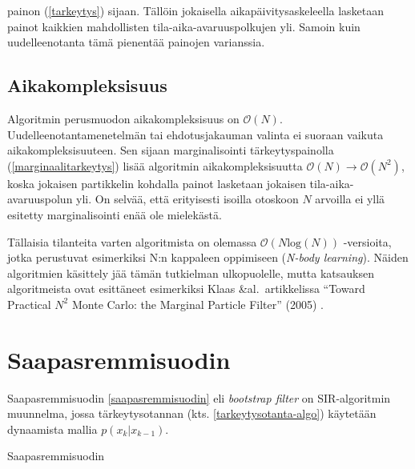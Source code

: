 \documentclass[
  12pt,
  a4paper, twoside]{book}
\begin{document}
\noindent painon (\ref{tarkeytys}) sijaan. Tällöin jokaisella aikapäivitysaskeleella lasketaan painot kaikkien mahdollisten tila-aika-avaruuspolkujen yli. Samoin kuin uudelleenotanta tämä pienentää painojen varianssia.

\subsection{Aikakompleksisuus}

Algoritmin perusmuodon aikakompleksisuus on \(\mathcal{O}(N)\). Uudelleenotantamenetelmän tai ehdotusjakauman valinta ei suoraan vaikuta aikakompleksisuuteen. Sen sijaan marginalisointi tärkeytyspainolla (\ref{marginaalitarkeytys}) lisää algoritmin aikakompleksisuutta \(\mathcal{O}(N)\rightarrow\mathcal{O}(N^2)\), koska jokaisen partikkelin kohdalla painot lasketaan jokaisen tila-aika-avaruuspolun yli. On selvää, että erityisesti isoilla otoskoon \(N\) arvoilla ei yllä esitetty marginalisointi enää ole mielekästä.

Tällaisia tilanteita varten algoritmista on olemassa \(\mathcal{O}(N\text{log}(N))\) -versioita, jotka perustuvat esimerkiksi N:n kappaleen oppimiseen (\emph{N-body learning}). Näiden algoritmien käsittely jää tämän tutkielman ulkopuolelle, mutta katsauksen algoritmeista ovat esittäneet esimerkiksi Klaas \&al.~artikkelissa ``Toward Practical \(N^2\) Monte Carlo: the Marginal Particle Filter'' (2005) \citep{klaas-2005}.

\section{Saapasremmisuodin}

Saapasremmisuodin \ref{saapasremmisuodin} eli \emph{bootstrap filter} on SIR-algoritmin muunnelma, jossa tärkeytysotannan (kts. \ref{tarkeytysotanta-algo}) käytetään dynaamista mallia \(p(x_k|x_{k-1})\).

\begin{algorithm}[H]
\label{saapasremmisuodin}
\DontPrintSemicolon
\SetAlgoShortEnd
{}
\caption{Saapasremmisuodin}
\end{algorithm}
\end{document}
